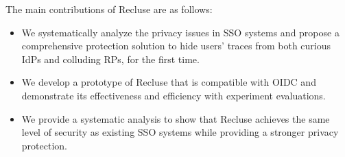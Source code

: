 

The main contributions of Recluse are as follows:
\begin{itemize}
\item We systematically analyze the privacy issues in SSO systems and propose a comprehensive protection solution to hide users' traces from both curious IdPs and colluding RPs, for the first time.
\item We develop a prototype of Recluse that is compatible with OIDC and demonstrate its effectiveness and efficiency with experiment evaluations.
\item We provide a systematic analysis to show that Recluse achieves the same level of security as existing SSO systems while providing a stronger privacy protection.
\end{itemize}



